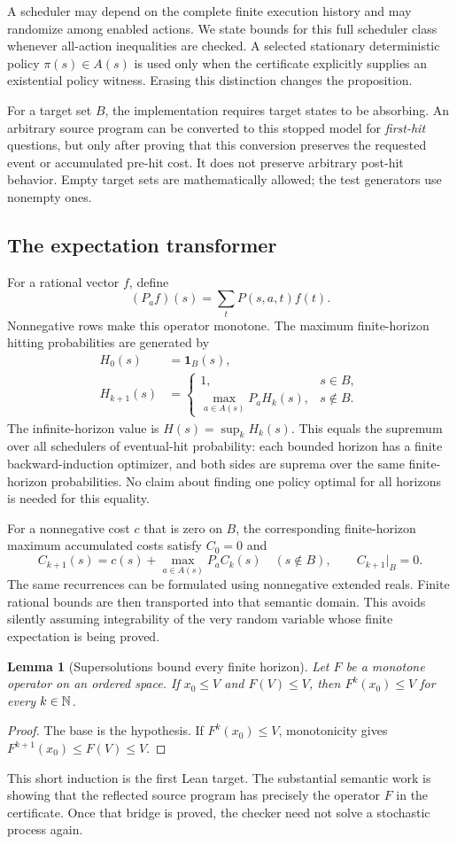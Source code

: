 \documentclass[11pt,letterpaper]{article}
\newtheorem{lemma}[theorem]{Lemma}
\theoremstyle{definition}\newtheorem{definition}[theorem]{Definition}
\theoremstyle{remark}\newtheorem{remark}[theorem]{Remark}
\newcommand{\ind}{\mathbf 1}\newcommand{\forge}{\texttt{forge}}
\begin{document}
A scheduler may depend on the complete finite execution history and may randomize among enabled actions. We state bounds for this full scheduler class whenever all-action inequalities are checked. A selected stationary deterministic policy $\pi(s)\in A(s)$ is used only when the certificate explicitly supplies an existential policy witness. Erasing this distinction changes the proposition.

For a target set $B$, the implementation requires target states to be absorbing. An arbitrary source program can be converted to this stopped model for \emph{first-hit} questions, but only after proving that this conversion preserves the requested event or accumulated pre-hit cost. It does not preserve arbitrary post-hit behavior. Empty target sets are mathematically allowed; the test generators use nonempty ones.

\subsection{The expectation transformer}
For a rational vector $f$, define
\[
 (P_af)(s)=\sum_tP(s,a,t)f(t).
\]
Nonnegative rows make this operator monotone. The maximum finite-horizon hitting probabilities are generated by
\begin{align*}
 H_0(s)&=\ind_B(s),\\
 H_{k+1}(s)&=
 \begin{cases}1,&s\in B,\\ \max_{a\in A(s)}P_aH_k(s),&s\notin B.\end{cases}
\end{align*}
The infinite-horizon value is $H(s)=\sup_kH_k(s)$. This equals the supremum over all schedulers of eventual-hit probability: each bounded horizon has a finite backward-induction optimizer, and both sides are suprema over the same finite-horizon probabilities. No claim about finding one policy optimal for all horizons is needed for this equality.

For a nonnegative cost $c$ that is zero on $B$, the corresponding finite-horizon maximum accumulated costs satisfy $C_0=0$ and
\[
 C_{k+1}(s)=c(s)+\max_{a\in A(s)}P_a C_k(s)
 \quad(s\notin B),\qquad C_{k+1}|_B=0.
\]
The same recurrences can be formulated using nonnegative extended reals. Finite rational bounds are then transported into that semantic domain. This avoids silently assuming integrability of the very random variable whose finite expectation is being proved.

\begin{lemma}[Supersolutions bound every finite horizon]\label{lem:super}
Let $F$ be a monotone operator on an ordered space. If $x_0\le V$ and $F(V)\le V$, then $F^k(x_0)\le V$ for every $k\in\mathbb N$.
\end{lemma}
\begin{proof}
The base is the hypothesis. If $F^k(x_0)\le V$, monotonicity gives $F^{k+1}(x_0)\le F(V)\le V$.
\end{proof}
This short induction is the first Lean target. The substantial semantic work is showing that the reflected source program has precisely the operator $F$ in the certificate. Once that bridge is proved, the checker need not solve a stochastic process again.
\end{document}
